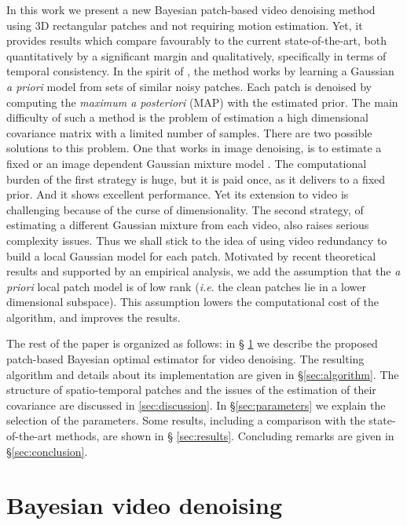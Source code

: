 \documentclass[10pt, journal, twocolumn, final, a4paper]{IEEEtran}
\newcommand{\ie}{\emph{i.e}. } \newcommand{\Ie}{\emph{I.e}. }
\begin{document}
In this work we present a new Bayesian patch-based video denoising method using
3D rectangular patches and not requiring motion estimation.
Yet, it provides
results which compare favourably to the current state-of-the-art,
both quantitatively by a significant margin and qualitatively, specifically in
terms of temporal consistency.
In the spirit of  \cite{Lebrun2013a,Lebrun2013ipol},
the method works by learning a Gaussian \emph{a priori} model from sets of 
similar noisy patches. Each patch is denoised by computing the \emph{maximum a
posteriori} (MAP) with the estimated prior.
The main difficulty of such a method is the problem of estimation a high
dimensional covariance matrix with a limited number of samples. 
%
There are two possible solutions to this problem. One that works in image
denoising, is to estimate a fixed \cite{Zoran2011} or an image dependent
Gaussian mixture model \cite{Chatterjee2012}.  The computational burden of the first
strategy is huge, but it is paid once, as it delivers to a fixed prior. And it
shows excellent performance. Yet its extension to video is challenging because
of the curse of dimensionality. The second strategy, of estimating a different
Gaussian mixture from each video, also raises serious complexity issues. Thus
we shall stick to the idea of using video redundancy to build a local Gaussian
model for each patch.
%
Motivated by recent 
theoretical results and supported by an empirical analysis, we add the 
assumption that the \emph{a priori} local patch model is of low rank (\ie the clean patches
lie in a lower dimensional subspace). This assumption lowers the computational cost
of the algorithm, and improves the results.



\bigskip

The rest of the paper is organized as follows: in \S
\ref{sec:review_nonlocal_Bayes} we describe the proposed patch-based Bayesian optimal estimator for
video denoising. The resulting algorithm and details about its implementation are
given in \S \ref{sec:algorithm}.
The structure of spatio-temporal  patches and the issues of the estimation of
their covariance are discussed in \ref{sec:discussion}.
In \S \ref{sec:parameters}
we explain the selection of the parameters. Some results, including a
comparison with the state-of-the-art methods, are shown in \S
\ref{sec:results}. Concluding remarks are given in \S \ref{sec:conclusion}.

\section{Bayesian video denoising}
\label{sec:review_nonlocal_Bayes}
\end{document}
